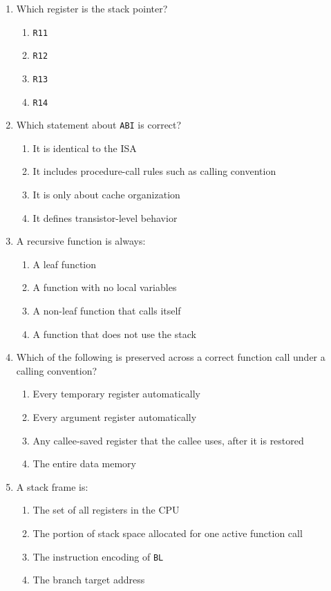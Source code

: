 \documentclass[11pt]{article}
\begin{document}
\begin{enumerate}[label=\textbf{A\arabic*.}]
  \item Which register is the stack pointer?
  \begin{enumerate}[label=(\Alph*)]
    \item \texttt{R11}
    \item \texttt{R12}
    \item \texttt{R13}
    \item \texttt{R14}
  \end{enumerate}

  \item Which statement about \texttt{ABI} is correct?
  \begin{enumerate}[label=(\Alph*)]
    \item It is identical to the ISA
    \item It includes procedure-call rules such as calling convention
    \item It is only about cache organization
    \item It defines transistor-level behavior
  \end{enumerate}

  \item A recursive function is always:
  \begin{enumerate}[label=(\Alph*)]
    \item A leaf function
    \item A function with no local variables
    \item A non-leaf function that calls itself
    \item A function that does not use the stack
  \end{enumerate}

  \item Which of the following is preserved across a correct function call under a calling convention?
  \begin{enumerate}[label=(\Alph*)]
    \item Every temporary register automatically
    \item Every argument register automatically
    \item Any callee-saved register that the callee uses, after it is restored
    \item The entire data memory
  \end{enumerate}

  \item A stack frame is:
  \begin{enumerate}[label=(\Alph*)]
    \item The set of all registers in the CPU
    \item The portion of stack space allocated for one active function call
    \item The instruction encoding of \texttt{BL}
    \item The branch target address
  \end{enumerate}
\end{enumerate}
\end{document}

